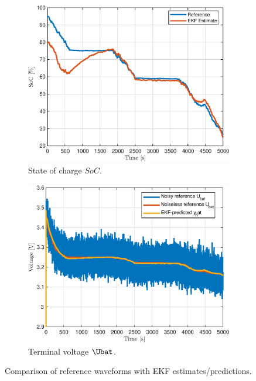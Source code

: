 \begin{figure}[H]
    \centering
\begin{subfigure}{0.49\textwidth}
    \centering
    \includegraphics[width=\textwidth]{figures/8/ekf-soc.eps}
    \caption{State of charge $SoC$.}
    \label{fig:8-ekf-soc}
    \end{subfigure}
    \hfill
    \begin{subfigure}{0.49\textwidth}
    \centering
    \includegraphics[width=\textwidth]{figures/8/ekf-U.eps}
    \caption{Terminal voltage $\Ubat$.}
    \label{fig:8-ekf-U}
    \end{subfigure}
    
    \caption{Comparison of reference waveforms with EKF estimates/predictions.}
    \label{fig:8-ekf}
\end{figure}

